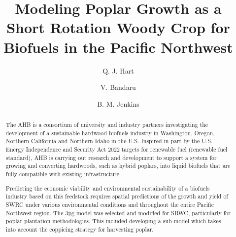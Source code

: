 \documentclass[preprint,12pt]{elsarticle}
\begin{document}
\begin{frontmatter}



\title{Modeling Poplar Growth as a Short Rotation Woody Crop for Biofuels in the Pacific Northwest}


\author[lawr]{Q. J. Hart}
\author[en]{V. Bandaru}
\author[bioag]{B. M. Jenkins}

\address{Department of Land, Air, and Water, University of California, Davis, USA}
\address{Energy Institute, University of California, Davis, USA}
\address{Department of Biological and Agricultural Engineering, University of California, Davis, USA}

\begin{abstract}
  The \acf{AHB} is a consortium of university and industry partners
  investigating the development of a sustainable hardwood biofuels
  industry in Washington, Oregon, Northern California and Northern
  Idaho in the U.S.  Inspired in part by the U.S. Energy Independence
  and Security Act 2022 targets for renewable fuel (renewable fuel
  standard), \ac{AHB} is carrying out research and development to
  support a system for growing and converting hardwoods, such as
  hybrid poplars, into liquid biofuels that are fully compatible with
  existing infrastructure.

  Predicting the economic viability and environmental sustainability
  of a biofuels industry based on this feedstock requires spatial
  predictions of the growth and yield of \acf{SWRC} under various
  environmental conditions and throughout the entire Pacific Northwest
  region.  The \acf{3pg} model was selected and modified for \ac{SRWC},
  particularly for poplar plantation methodologies.  This included
  developing a sub-model which takes into account the coppicing
  strategy for harvesting poplar.


\end{abstract}
\end{frontmatter}
\end{document}
